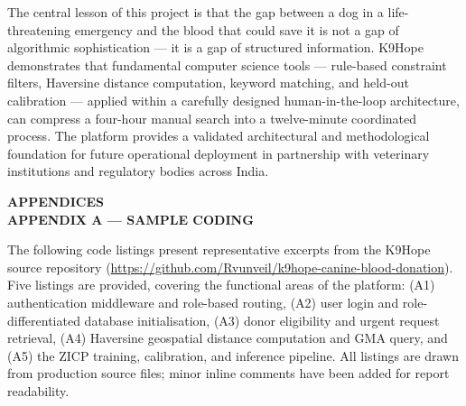 \documentclass[12pt,a4paper]{article}
\begin{document}
\vspace{1.5em}
\noindent The central lesson of this project is that the gap between a dog in a life-threatening emergency and the blood that could save it is not a gap of algorithmic sophistication — it is a gap of structured information. K9Hope demonstrates that fundamental computer science tools — rule-based constraint filters, Haversine distance computation, keyword matching, and held-out calibration — applied within a carefully designed human-in-the-loop architecture, can compress a four-hour manual search into a twelve-minute coordinated process. The platform provides a validated architectural and methodological foundation for future operational deployment in partnership with veterinary institutions and regulatory bodies across India.

\newpage
\begin{center}
    \textbf{\large APPENDICES}\\[0.6em]
    \textbf{\large APPENDIX A — SAMPLE CODING}
\end{center}
\vspace{1em}

\noindent The following code listings present representative excerpts from the K9Hope source repository (\url{https://github.com/Rvunveil/k9hope-canine-blood-donation}). Five listings are provided, covering the functional areas of the platform: (A1) authentication middleware and role-based routing, (A2) user login and role-differentiated database initialisation, (A3) donor eligibility and urgent request retrieval, (A4) Haversine geospatial distance computation and GMA query, and (A5) the ZICP training, calibration, and inference pipeline. All listings are drawn from production source files; minor inline comments have been added for report readability.
\end{document}
